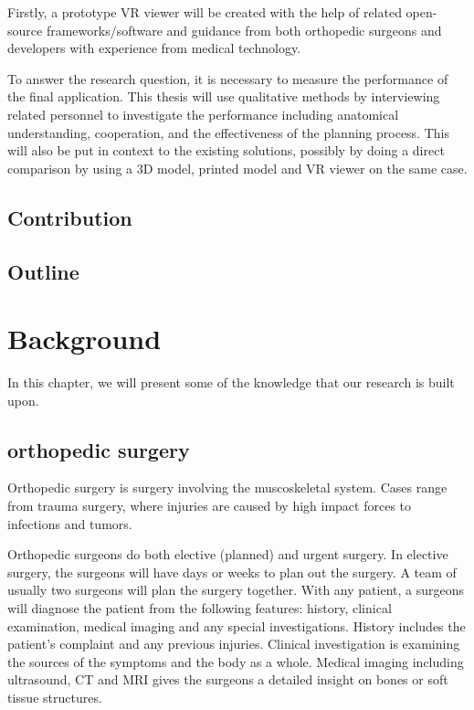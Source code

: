 \documentclass[a4paper]{report}
\begin{document}
Firstly, a prototype VR viewer will be created with the help of related
open-source frameworks/software and guidance from both orthopedic surgeons and
developers with experience from medical technology.

To answer the research question, it is necessary to measure the
performance of the final application. This thesis will use qualitative methods
by interviewing related personnel to investigate the performance including
anatomical understanding, cooperation, and the effectiveness of the planning
process.
This will also be put in context to the existing solutions, possibly
by doing a direct comparison by using a 3D model, printed model and VR viewer
on the same case.
\section{Contribution}
\section{Outline}

\chapter{Background}\label{Background}
In this chapter, we will present some of the knowledge that our research is built upon. 

\section{orthopedic surgery}

Orthopedic surgery is surgery involving the muscoskeletal system. Cases range from trauma surgery, where injuries are caused by high impact forces to infections and tumors\cite{manual ortho}.

Orthopedic surgeons do both elective (planned) and urgent surgery. In elective surgery, the surgeons will have days or weeks to plan out the surgery. A team of usually two surgeons will plan the surgery together.
With any patient, a surgeons will diagnose the patient from the following features: history, clinical examination, medical imaging and any special investigations. History includes the patient's complaint and any previous injuries. Clinical investigation is  examining the sources of the symptoms and the body as a whole. Medical imaging including ultrasound, CT and MRI gives the surgeons a detailed insight on bones or soft tissue structures.
\end{document}
